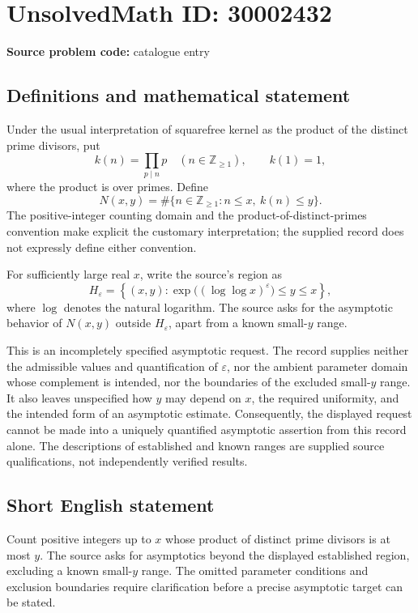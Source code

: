 \documentclass[11pt]{article}
\newcommand{\Z}{\mathbb{Z}}
\begin{document}
\section*{UnsolvedMath ID: 30002432}
\textbf{Source problem code:} catalogue entry
\subsection{Definitions and mathematical statement}
Under the usual interpretation of squarefree kernel as the product of the distinct prime divisors, put
\[
k(n)=\prod_{p\mid n}p\quad(n\in\Z_{\geq1}),\qquad k(1)=1,
\]
where the product is over primes. Define
\[
N(x,y)=\#\{n\in\Z_{\geq1}:n\leq x,\ k(n)\leq y\}.
\]
The positive-integer counting domain and the product-of-distinct-primes convention make explicit the customary interpretation; the supplied record does not expressly define either convention.

For sufficiently large real \(x\), write the source's region as
\[
H_{\varepsilon}=\left\{(x,y):\exp\bigl((\log\log x)^{\varepsilon}\bigr)\leq y\leq x\right\},
\]
where \(\log\) denotes the natural logarithm. The source asks for the asymptotic behavior of \(N(x,y)\) outside \(H_{\varepsilon}\), apart from a known small-\(y\) range.

This is an incompletely specified asymptotic request. The record supplies neither the admissible values and quantification of \(\varepsilon\), nor the ambient parameter domain whose complement is intended, nor the boundaries of the excluded small-\(y\) range. It also leaves unspecified how \(y\) may depend on \(x\), the required uniformity, and the intended form of an asymptotic estimate. Consequently, the displayed request cannot be made into a uniquely quantified asymptotic assertion from this record alone. The descriptions of established and known ranges are supplied source qualifications, not independently verified results.
\subsection{Short English statement}
Count positive integers up to \(x\) whose product of distinct prime divisors is at most \(y\). The source asks for asymptotics beyond the displayed established region, excluding a known small-\(y\) range. The omitted parameter conditions and exclusion boundaries require clarification before a precise asymptotic target can be stated.
\end{document}
